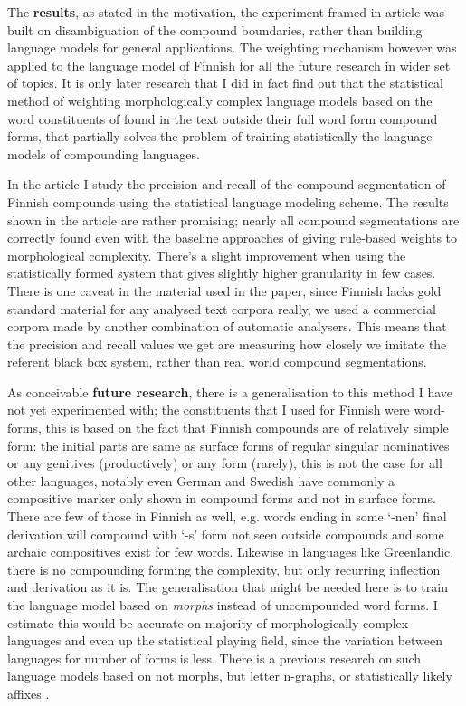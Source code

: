 \documentclass[officiallayout]{unihelcompling}
\begin{document}
The \textbf{results}, as stated in the motivation, the experiment framed in
article was built on disambiguation of the compound boundaries, rather than
building language models for general applications. The weighting mechanism
however was applied to the language model of Finnish for all the future
research in wider set of topics. It is only later research that I did in fact
find out that the statistical method of weighting morphologically complex
language models based on the word constituents of found in the text outside
their full word form compound forms, that partially solves the problem of
training statistically the language models of compounding languages.

In the article I study the precision and recall of the compound segmentation
of Finnish compounds using the statistical language modeling scheme. The
results shown in the article are rather promising; nearly all compound
segmentations are correctly found even with the baseline approaches of giving
rule-based weights to morphological complexity. There's a slight improvement
when using the statistically formed system that gives slightly higher
granularity in few cases. There is one caveat in the material used in the
paper, since Finnish lacks gold standard material for any analysed text
corpora really, we used a commercial corpora made by another combination
of automatic analysers. This means that the precision and recall values we
get are measuring how closely we imitate the referent black box system, rather
than real world compound segmentations.

As conceivable \textbf{future research}, there is a generalisation to this
method I have not yet experimented with; the constituents that I used for
Finnish were word-forms, this is based on the fact that Finnish compounds are
of relatively simple form: the initial parts are same as surface forms of
regular singular nominatives or any genitives (productively) or any form
(rarely), this is not the case for all other languages, notably even German and
Swedish have commonly a compositive marker only shown in compound forms and not
in surface forms. There are few of those in Finnish as well, e.g. words ending
in some `-nen' final derivation will compound with `-s' form not seen outside
compounds and some archaic compositives exist for few words. Likewise in
languages like Greenlandic, there is no compounding forming the complexity, but
only recurring inflection and derivation as it is. The generalisation that
might be needed here is to train the language model based on \emph{morphs}
instead of uncompounded word forms. I estimate this would be accurate on
majority of morphologically complex languages and even up the statistical
playing field, since the variation between languages for number of forms is
less.  There is a previous research on such language models based
on not morphs, but letter n-graphs, or statistically likely affixes
\citep{creutz2005morfessor}.
\end{document}
